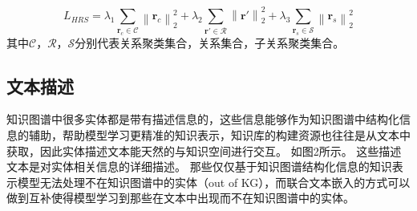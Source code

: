 \documentclass[twocolumn]{article}
\newcommand{\upcite}[1]{\textsuperscript{\textsuperscript{\cite{#1}}}}
\begin{document}
	\begin{equation}
		L_{HRS}=\lambda_1\sum_{\textbf{r}_c\in \mathcal{C}}\left \| \textbf{r}_c \right \|_2^2+\lambda_2\sum_{\textbf{r}'\in \mathcal{R}}\left \| \textbf{r}' \right \|_2^2+\lambda_3\sum_{\textbf{r}_s\in\mathcal{S}}\left \| \textbf{r}_s \right \|_2^2
	\end{equation}
	其中$\mathcal{C}$，$\mathcal{R}$，$\mathcal{S}$分别代表关系聚类集合，关系集合，子关系聚类集合。
	
	
\subsection{文本描述}
	知识图谱中很多实体都是带有描述信息的，这些信息能够作为知识图谱中结构化信息的辅助，帮助模型学习更精准的知识表示，知识库的构建资源也往往是从文本中获取，因此实体描述文本能天然的与知识空间进行交互。
	如图2所示。
	这些描述文本是对实体相关信息的详细描述。
	那些仅仅基于知识图谱结构化信息的知识表示模型无法处理不在知识图谱中的实体（out of KG），而联合文本嵌入的方式可以做到互补使得模型学习到那些在文本中出现而不在知识图谱中的实体。
	
\end{document}
